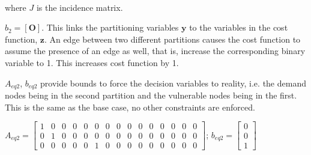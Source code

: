 \documentclass[authoryear,preprint,review,12pt]{elsarticle}
\begin{document}
	\\

 where $J$ is the incidence matrix.

$b_{2}=\left[\mathbf{O}\right]$. This links the partitioning variables
$\mathbf{y}$ to the variables in the cost function, $\mathbf{z}$.
An edge between two different partitions causes the cost function
to assume the presence of an edge as well, that is, increase the
corresponding binary variable to 1. This increases cost function by 1.

$A_{eq2}$, $b_{eq2}$ provide bounds to force the decision variables
to reality, i.e. the demand nodes being in the second partition and the vulnerable nodes being in the first. \\
This is the same as the base case, no other constraints are enforced.

$A_{eq2}=\left[\begin{array}{ccccccccccccccc}
1 & 0 & 0 & 0 & 0 & 0 & 0 & 0 & 0 & 0 & 0 & 0 & 0 & 0 & 0\\
0 & 1 & 0 & 0 & 0 & 0 & 0 & 0 & 0 & 0 & 0 & 0 & 0 & 0 & 0\\
0 & 0 & 0 & 0 & 0 & 1 & 0 & 0 & 0 & 0 & 0 & 0 & 0 & 0 & 0
\end{array}\right]$; $b_{eq2}=\left[\begin{array}{c}
0\\
0\\
1
\end{array}\right]$\\
\end{document}
